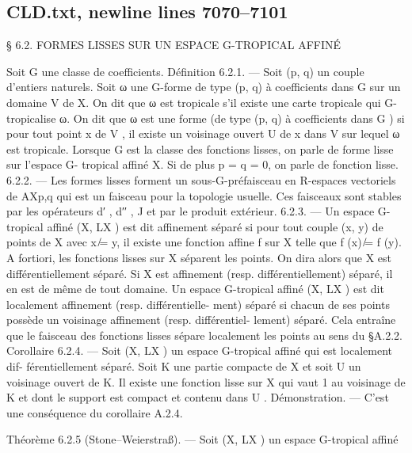 \documentclass[
  10pt,
]{article}
\newenvironment{Shaded}{}{}
\newcommand{\NormalTok}[1]{#1}
\begin{document}
\subsection{CLD.txt, newline lines
7070--7101}\label{cld.txt-newline-lines-70707101}

\begin{Shaded}
\begin{Highlighting}[]


\NormalTok{      § 6.2. FORMES LISSES SUR UN ESPACE G{-}TROPICAL AFFINÉ}

\NormalTok{  Soit G une classe de coefficients.}
\NormalTok{Définition 6.2.1. — Soit (p, q) un couple d’entiers naturels. Soit ω une G{-}forme de}
\NormalTok{type (p, q) à coefficients dans G sur un domaine V de X.}
\NormalTok{  On dit que ω est tropicale s’il existe une carte tropicale qui G{-}tropicalise ω.}
\NormalTok{  On dit que ω est une forme (de type (p, q) à coefficients dans G ) si pour tout point x}
\NormalTok{de V , il existe un voisinage ouvert U de x dans V sur lequel ω est tropicale.}
\NormalTok{  Lorsque G est la classe des fonctions lisses, on parle de forme lisse sur l’espace G{-}}
\NormalTok{tropical affiné X. Si de plus p = q = 0, on parle de fonction lisse.}
\NormalTok{6.2.2. — Les formes lisses forment un sous{-}G{-}préfaisceau en R{-}espaces vectoriels}
\NormalTok{de AXp,q qui est un faisceau pour la topologie usuelle. Ces faisceaux sont stables par les}
\NormalTok{opérateurs d′ , d′′ , J et par le produit extérieur.}
\NormalTok{6.2.3. — Un espace G{-}tropical affiné (X, LX ) est dit affinement séparé si pour tout}
\NormalTok{couple (x, y) de points de X avec x ̸= y, il existe une fonction affine f sur X telle que}
\NormalTok{f (x) ̸= f (y). A fortiori, les fonctions lisses sur X séparent les points. On dira alors que}
\NormalTok{X est différentiellement séparé.}
\NormalTok{   Si X est affinement (resp. différentiellement) séparé, il en est de même de tout domaine.}
\NormalTok{   Un espace G{-}tropical affiné (X, LX ) est dit localement affinement (resp. différentielle{-}}
\NormalTok{ment) séparé si chacun de ses points possède un voisinage affinement (resp. différentiel{-}}
\NormalTok{lement) séparé.}
\NormalTok{   Cela entraîne que le faisceau des fonctions lisses sépare localement les points au sens}
\NormalTok{du §A.2.2.}
\NormalTok{Corollaire 6.2.4. — Soit (X, LX ) un espace G{-}tropical affiné qui est localement dif{-}}
\NormalTok{férentiellement séparé. Soit K une partie compacte de X et soit U un voisinage ouvert}
\NormalTok{de K. Il existe une fonction lisse sur X qui vaut 1 au voisinage de K et dont le support}
\NormalTok{est compact et contenu dans U .}
\NormalTok{Démonstration. — C’est une conséquence du corollaire A.2.4.}

\NormalTok{Théorème 6.2.5 (Stone–Weierstraß). — Soit (X, LX ) un espace G{-}tropical affiné}
\end{Highlighting}
\end{Shaded}
\end{document}
